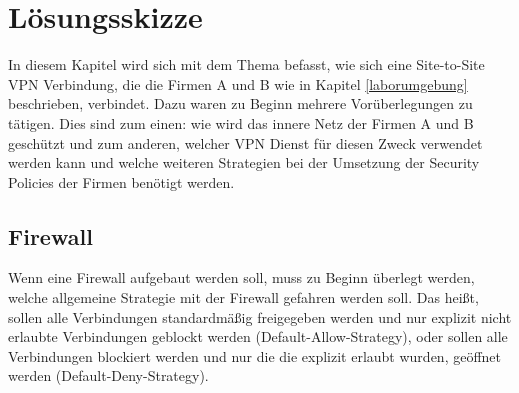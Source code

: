 \section{Lösungsskizze}\label{loesungsskizze}
In diesem Kapitel wird sich mit dem Thema befasst, wie sich eine Site-to-Site VPN Verbindung, die die Firmen A und B wie in Kapitel \ref{laborumgebung} beschrieben, verbindet.
Dazu waren zu Beginn mehrere Vorüberlegungen zu tätigen. Dies sind zum einen: wie wird das innere Netz der Firmen A und B geschützt und zum anderen, welcher VPN Dienst für diesen Zweck verwendet werden kann und welche weiteren Strategien bei der Umsetzung der Security Policies der Firmen benötigt werden. 
\subsection{Firewall}\label{firewallloesung}
Wenn eine Firewall aufgebaut werden soll, muss zu Beginn überlegt werden, welche allgemeine Strategie mit der Firewall gefahren werden soll. Das heißt, sollen alle Verbindungen standardmäßig freigegeben werden und nur explizit nicht erlaubte Verbindungen geblockt werden (Default-Allow-Strategy), oder sollen alle Verbindungen blockiert werden und nur die die explizit erlaubt wurden, geöffnet werden (Default-Deny-Strategy). 

